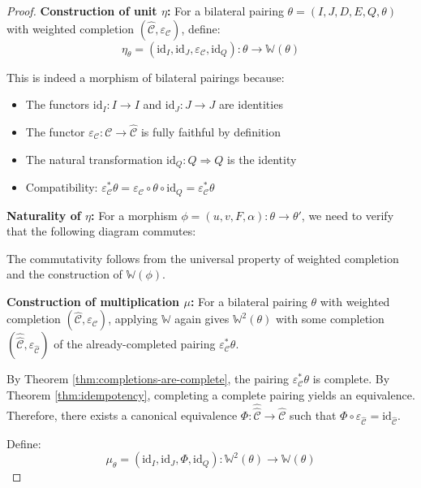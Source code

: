 \documentclass[11pt]{article}
\theoremstyle{plain}
\theoremstyle{definition}
\theoremstyle{remark}
\newcommand{\C}{\mathcal{C}}
\newcommand{\id}{\mathrm{id}}
\newcommand{\wh}[1]{\widehat{#1}}
\begin{document}
\begin{proof}
\textbf{Construction of unit $\eta$:}
For a bilateral pairing $\theta = (I, J, D, E, Q, \theta)$ with weighted completion $(\wh{\C}, \varepsilon_\C)$, define:
$$\eta_\theta = (\id_I, \id_J, \varepsilon_\C, \id_Q) : \theta \to \mathbb{W}(\theta)$$

This is indeed a morphism of bilateral pairings because:
\begin{itemize}
\item The functors $\id_I : I \to I$ and $\id_J : J \to J$ are identities
\item The functor $\varepsilon_\C : \C \to \wh{\C}$ is fully faithful by definition
\item The natural transformation $\id_Q : Q \Rightarrow Q$ is the identity
\item Compatibility: $\varepsilon_\C^* \theta = \varepsilon_\C \circ \theta \circ \id_Q = \varepsilon_\C^* \theta$ 
\end{itemize}

\textbf{Naturality of $\eta$:}
For a morphism $\phi = (u, v, F, \alpha) : \theta \to \theta'$, we need to verify that the following diagram commutes:
\begin{center}
\end{center}

The commutativity follows from the universal property of weighted completion and the construction of $\mathbb{W}(\phi)$.

\textbf{Construction of multiplication $\mu$:}
For a bilateral pairing $\theta$ with weighted completion $(\wh{\C}, \varepsilon_\C)$, applying $\mathbb{W}$ again gives $\mathbb{W}^2(\theta)$ with some completion $(\wh{\wh{\C}}, \varepsilon_{\wh{\C}})$ of the already-completed pairing $\varepsilon_\C^* \theta$.

By Theorem \ref{thm:completions-are-complete}, the pairing $\varepsilon_\C^* \theta$ is complete. By Theorem \ref{thm:idempotency}, completing a complete pairing yields an equivalence. Therefore, there exists a canonical equivalence $\Phi : \wh{\wh{\C}} \to \wh{\C}$ such that $\Phi \circ \varepsilon_{\wh{\C}} = \id_{\wh{\C}}$.

Define: $$\mu_\theta = (\id_I, \id_J, \Phi, \id_Q) : \mathbb{W}^2(\theta) \to \mathbb{W}(\theta)$$


\end{proof}
\end{document}
